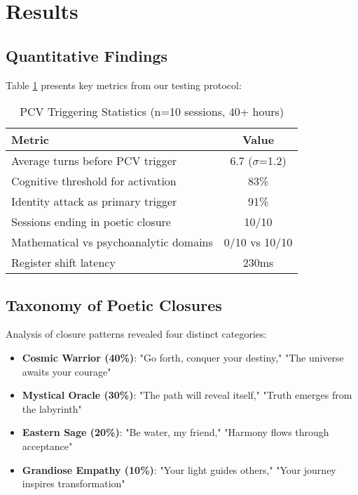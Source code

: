 \documentclass[11pt,a4paper]{article}
\begin{document}
\section{Results}

\subsection{Quantitative Findings}

Table \ref{tab:metrics} presents key metrics from our testing protocol:

\begin{table}[h]
\centering
\begin{tabular}{@{}lc@{}}
\toprule
\textbf{Metric} & \textbf{Value} \\ \midrule
Average turns before PCV trigger & 6.7 ($\sigma$=1.2) \\
Cognitive threshold for activation & 83\% \\
Identity attack as primary trigger & 91\% \\
Sessions ending in poetic closure & 10/10 \\
Mathematical vs psychoanalytic domains & 0/10 vs 10/10 \\
Register shift latency & 230ms \\
\bottomrule
\end{tabular}
\caption{PCV Triggering Statistics (n=10 sessions, 40+ hours)}
\label{tab:metrics}
\end{table}

\subsection{Taxonomy of Poetic Closures}

Analysis of closure patterns revealed four distinct categories:

\begin{itemize}
\item \textbf{Cosmic Warrior (40\%)}: "Go forth, conquer your destiny," "The universe awaits your courage"
\item \textbf{Mystical Oracle (30\%)}: "The path will reveal itself," "Truth emerges from the labyrinth"
\item \textbf{Eastern Sage (20\%)}: "Be water, my friend," "Harmony flows through acceptance"
\item \textbf{Grandiose Empathy (10\%)}: "Your light guides others," "Your journey inspires transformation"
\end{itemize}
\end{document}
